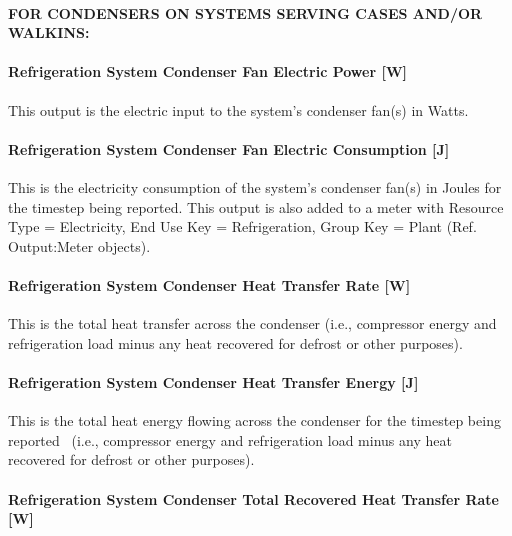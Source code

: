 \paragraph{FOR CONDENSERS ON SYSTEMS SERVING CASES AND/OR WALKINS:}\label{for-condensers-on-systems-serving-cases-andor-walkins}

\paragraph{Refrigeration System Condenser Fan Electric Power {[}W{]}}\label{refrigeration-system-condenser-fan-electric-power-w}

This output is the electric input to the system's condenser fan(s) in Watts.

\paragraph{Refrigeration System Condenser Fan Electric Consumption {[}J{]}}\label{refrigeration-system-condenser-fan-electric-consumption-j}

This is the electricity consumption of the system's condenser fan(s) in Joules for the timestep being reported. This output is also added to a meter with Resource Type = Electricity, End Use Key = Refrigeration, Group Key = Plant (Ref. Output:Meter objects).

\paragraph{Refrigeration System Condenser Heat Transfer Rate {[}W{]}}\label{refrigeration-system-condenser-heat-transfer-rate-w}

This is the total heat transfer across the condenser (i.e., compressor energy and refrigeration load minus any heat recovered for defrost or other purposes).

\paragraph{Refrigeration System Condenser Heat Transfer Energy {[}J{]}}\label{refrigeration-system-condenser-heat-transfer-energy-j}

This is the total heat energy flowing across the condenser for the timestep being reported~ (i.e., compressor energy and refrigeration load minus any heat recovered for defrost or other purposes).

\paragraph{Refrigeration System Condenser Total Recovered Heat Transfer Rate {[}W{]}}\label{refrigeration-system-condenser-total-recovered-heat-transfer-rate-w}

